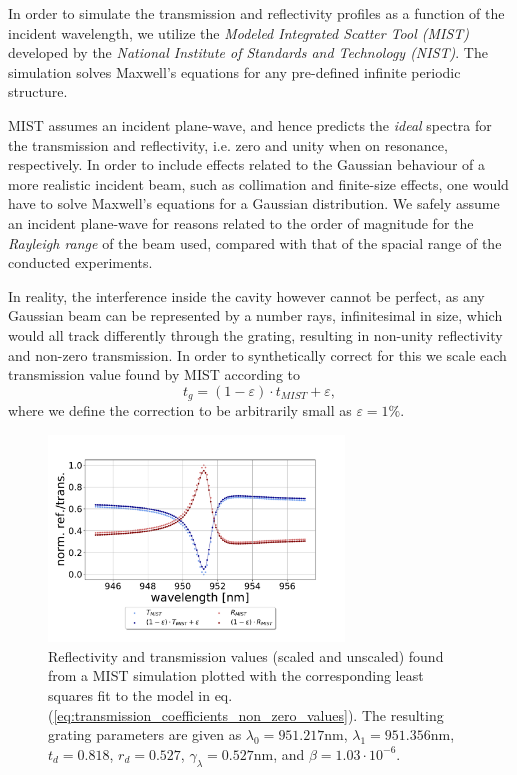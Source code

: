 In order to simulate the transmission and reflectivity profiles as a function of the incident wavelength, we utilize the \emph{Modeled Integrated Scatter Tool (MIST)} developed by the \emph{National Institute of Standards and Technology (NIST)}\cite{MIST}. The simulation solves Maxwell's equations for any pre-defined infinite periodic structure. 

MIST assumes an incident plane-wave, and hence predicts the \emph{ideal} spectra for the transmission and reflectivity, i.e. zero and unity when on resonance, respectively. In order to include effects related to the Gaussian behaviour of a more realistic incident beam, such as collimation and finite-size effects\cite{Toft-Vandborg}, one would have to solve Maxwell's equations for a Gaussian distribution. We safely assume an incident plane-wave for reasons related to the order of magnitude for the \emph{Rayleigh range} of the beam used, compared with that of the spacial range of the conducted experiments.

In reality, the interference inside the cavity however cannot be perfect, as any Gaussian beam can be represented by a number rays, infinitesimal in size, which would all track differently through the grating, resulting in non-unity reflectivity and non-zero transmission. In order to synthetically correct for this we scale each transmission value found by MIST according to
\begin{equation}
    t_g = (1 - \varepsilon) \cdot t_{MIST} + \varepsilon,
    \label{eq:trans_correction_MIST}
\end{equation}
where we define the correction to be arbitrarily small as $\varepsilon = 1\%$.

\begin{figure}[h!]
    \centering
    \includegraphics[width=0.7\textwidth]{figures/MIST_grating_sim.pdf}
    \caption{Reflectivity and transmission values (scaled and unscaled) found from a MIST simulation plotted with the corresponding least squares fit to the model in eq. (\ref{eq:transmission_coefficients_non_zero_values}). The resulting grating parameters are given as $\lambda_0 = 951.217$nm, $\lambda_1 = 951.356$nm, $t_d = 0.818$, $r_d = 0.527$, $\gamma_{\lambda} = 0.527$nm, and $\beta = 1.03 \cdot 10^{-6}$.}
    \label{fig:MIST_sim_of_grating}
\end{figure}


